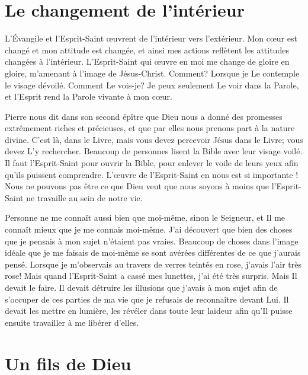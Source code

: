 \section{Le changement de l'int\'erieur}

\begin{specialpar}{}
L'Évangile et l'Esprit-Saint œuvrent de l'intérieur vers l'ex\-té\-ri\-eur.
 Mon cœur est changé et mon attitude est changée,
 et ainsi mes actions reflètent les attitudes changées à l'intérieur.
 L'Esprit-Saint qui œuvre en moi me change de gloire en gloire,
 m'amenant à l'image de Jésus-Christ. Comment?
 Lorsque je Le contemple le visage dévoilé.
 Comment Le vois-je? Je peux seulement Le voir dans la Parole,
 et l'Esprit rend la Parole vivante à mon cœur.
\end{specialpar}

Pierre nous dit dans son second épître que Dieu nous a donné
 des promesses extrêmement riches et précieuses,
 et que par elles nous prenons part à la nature divine.
 C'est là, dans le Livre, mais vous devez percevoir Jésus dans le Livre;
 vous devez L'y rechercher.
 Beaucoup de personnes lisent la Bible avec leur visage voilé.
 Il faut l'Esprit-Saint pour ouvrir la Bible, pour enlever le voile
 de leurs yeux afin qu'ils puissent comprendre.
 L'œuvre de l'Esprit-Saint en nous est si importante !
 Nous ne pouvons pas être ce que Dieu veut que nous soyons
 à moins que l'Esprit-Saint ne travaille au sein de notre vie.

Personne ne me connaît aussi bien que moi-même, sinon le Seigneur,
 et Il me connaît mieux que je me connais moi-même.
 J'ai découvert que bien des choses que je pensais
 à mon sujet n'étaient pas vraies.
 Beaucoup de choses dans l'image idéale que je me faisais de moi-même
 se sont avérées différentes de ce que j'aurais pensé.
 Lorsque je m'observais au travers de verres teintés en rose,
 j'avais l'air très rose!
 Mais quand l'Esprit-Saint a cassé mes lunettes,
 j'ai été très surpris. Mais Il devait le faire.
 Il devait détruire les illusions que j'avais à mon sujet afin de s'occuper
 de ces parties de ma vie que je refusais de reconnaître devant Lui.
 Il devait les mettre en lumière, les révéler dans toute leur laideur
 afin qu'Il puisse ensuite travailler à me libérer d'elles.


\section{Un fils de Dieu}

